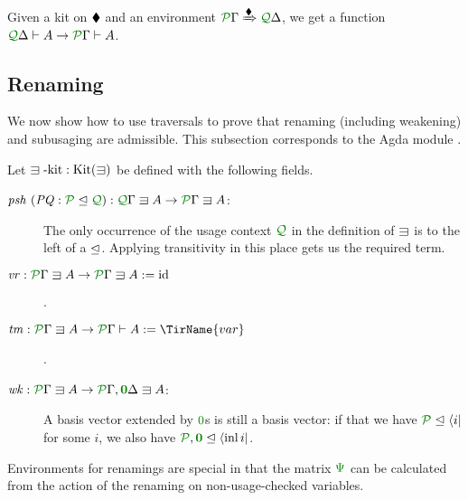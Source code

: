 \documentclass[submission,copyright,creativecommons]{eptcs}
\begin{document}
\newcommand{\thmtrav}{%
  Given a kit on $\kitrel$ and an environment
  $\ctx{\Gamma}{P} \subst{\kitrel} \ctx{\Delta}{Q}$, we get a function
  $\ctx{\Delta}{Q} \vdash A \to \ctx{\Gamma}{P} \vdash A$.%
}
\begin{theorem}\label{thm:trav}
  \thmtrav
\end{theorem}

\subsection{Renaming}

We now show how to use traversals to prove that renaming (including
weakening) and subusaging are admissible. This subsection corresponds
to the Agda module .

\begin{definition}\label{def:lvar-kit}
  Let $\lvar\textrm{-kit} : \kit(\lvar)$ be defined with the following
  fields.
  \begin{description}
    \item[$\mathit{psh}~(\mathit{PQ} : \resctx P \subres \resctx Q)
      : \ctx{\Gamma}{Q} \lvar A \to \ctx{\Gamma}{P} \lvar A$:]
      The only occurrence of the usage context $\resctx Q$ in the definition of
      $\lvar$ is to the left of a $\trianglelefteq$.
      Applying transitivity in this place gets us the required term.
    \item[$\mathit{vr} : \ctx{\Gamma}{P} \lvar A \to \ctx{\Gamma}{P} \lvar A
      := \mathrm{id}$].
    \item[$\mathit{tm} : \ctx{\Gamma}{P} \lvar A \to \ctx{\Gamma}{P} \vdash A
      := \TirName{var}$].
    \item[$\mathit{wk} : \ctx{\Gamma}{P} \lvar A
      \to \ctx{\Gamma}{P}, \ctx{\Delta}{\vct 0} \lvar A$:]
      A basis vector extended by $\rescomment 0$s is still a basis
      vector: if that we have $\resctx P \subres \langle i \rvert$ for some $i$,
      we also have
      $\resctx P, \rescomment{\vct 0} \subres \langle \inl i \rvert$.
  \end{description}
\end{definition}

Environments for renamings are special in that the matrix $\rescomment\Psi$ can
be calculated from the action of the renaming on non-usage-checked variables.
\end{document}
